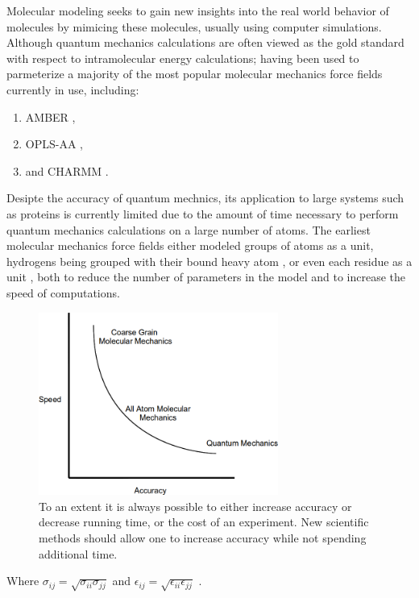 Molecular modeling seeks to gain new insights into the real world behavior of molecules by mimicing these molecules, usually using computer simulations.
Although quantum mechanics calculations are often viewed as the gold standard with respect to intramolecular energy calculations; 
having been used to parmeterize a majority of the most popular molecular mechanics force fields currently in use, including:
\begin{enumerate}
\item AMBER \cite{weiner1984new},
\item OPLS-AA \cite{kaminski1994free},
\item and CHARMM \cite{mackerell2002charmm}.
\end{enumerate}
Desipte the accuracy of quantum mechnics, its application to large systems such as proteins is currently limited due to the amount of time necessary to perform quantum mechanics calculations on a large number of atoms.
The earliest molecular mechanics force fields either modeled groups of atoms as a unit, hydrogens being grouped with their bound heavy atom \cite{jorgensen1988opls}, or even each residue as a unit \cite{lee1999energy}, both to reduce the number of parameters in the model and to increase the speed of computations.

\begin{figure}[H]
\begin{center}
\includegraphics[width=0.7\textwidth]{figures/conservation_of_annoyance.png}
\caption{To an extent it is always possible to either increase accuracy or decrease running time, or the cost of an experiment.
New scientific methods should allow one to increase accuracy while not spending additional time.}
\label{figure:pdb_growth}
\end{center}
\end{figure}







Where $\sigma_{ij} = \sqrt{\sigma_{ii} \sigma_{jj}}$ and $\epsilon_{ij} = \sqrt{\epsilon_{ii}\epsilon_{jj}}$ \cite{jorgensen1996development}.
